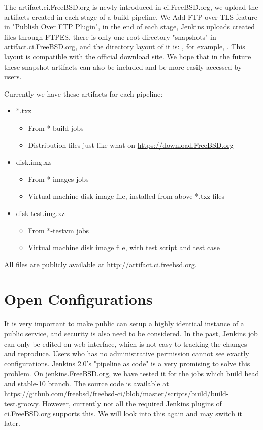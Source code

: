 \documentclass[a4paper,twocolumn,10pt]{article}
\begin{document}
The artifact.ci.FreeBSD.org is newly introduced in ci.FreeBSD.org, we upload
the artifacts created in each stage of a build pipeline. We Add FTP over TLS
feature in "Publish Over FTP Plugin", in the end of each stage, Jenkins uploads
created files through FTPES, there is only one root directory  "snapshots" in
artifact.ci.FreeBSD.org, and the directory layout of it is:
, for example,
 . This layout is compatible with the official
download site. We hope that in the future these snapshot artifacts can also be
included and be more easily accessed by users.

Currently we have these artifacts for each pipeline:

\begin{itemize}
\item *.txz
  \begin{itemize}
  \item From *-build jobs
  \item Distribution files just like what on \url{https://download.FreeBSD.org}
  \end{itemize}
\item disk.img.xz
  \begin{itemize}
  \item From *-images jobs
  \item Virtual machine disk image file, installed from above *.txz files
  \end{itemize}
\item disk-test.img.xz
  \begin{itemize}
  \item From *-testvm jobs
  \item Virtual machine disk image file, with test script and test case
  \end{itemize}
\end{itemize}

All files are publicly available at \url{http://artifact.ci.freebsd.org}.

\section{Open Configurations}
It is very important to make public can setup a highly identical instance of a
public service, and security is also need to be considered. In the past,
Jenkins job can only be edited on web interface, which is not easy to tracking
the changes and reproduce. Users who has no administrative permission cannot
see exactly configurations. Jenkins 2.0's "pipeline as code" is a very
promising to solve this problem. On jenkins.FreeBSD.org, we have tested it for
the jobs which build head and stable-10 branch. The source code is available at
\url{https://github.com/freebsd/freebsd-ci/blob/master/scripts/build/build-test.groovy}.
However, currently not all the required Jenkins plugins of ci.FreeBSD.org
supports this. We will look into this again and may switch it later.
\end{document}
